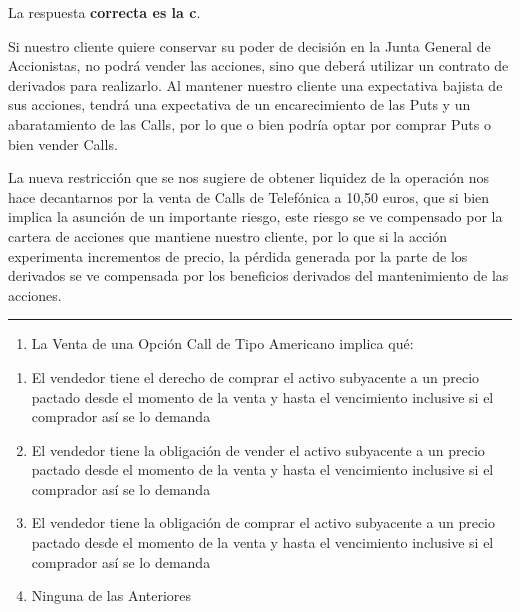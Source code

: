 \documentclass[
  letterpaper,
  DIV=11,
  numbers=noendperiod]{scrreprt}
\providecommand{\tightlist}{%
  \setlength{\itemsep}{0pt}\setlength{\parskip}{0pt}}\usepackage{longtable,booktabs,array}
\begin{document}
\begin{tcolorbox}[enhanced jigsaw, left=2mm, opacityback=0, colback=white, breakable, arc=.35mm, bottomrule=.15mm, rightrule=.15mm, toprule=.15mm, leftrule=.75mm, colframe=quarto-callout-tip-color-frame]
\begin{minipage}[t]{5.5mm}
\textcolor{quarto-callout-tip-color}{\faLightbulb}
\end{minipage}%
\begin{minipage}[t]{\textwidth - 5.5mm}

La respuesta \textbf{correcta es la c}.

Si nuestro cliente quiere conservar su poder de decisión en la Junta
General de Accionistas, no podrá vender las acciones, sino que deberá
utilizar un contrato de derivados para realizarlo. Al mantener nuestro
cliente una expectativa bajista de sus acciones, tendrá una expectativa
de un encarecimiento de las Puts y un abaratamiento de las Calls, por lo
que o bien podría optar por comprar Puts o bien vender Calls.

La nueva restricción que se nos sugiere de obtener liquidez de la
operación nos hace decantarnos por la venta de Calls de Telefónica a
10,50 euros, que si bien implica la asunción de un importante riesgo,
este riesgo se ve compensado por la cartera de acciones que mantiene
nuestro cliente, por lo que si la acción experimenta incrementos de
precio, la pérdida generada por la parte de los derivados se ve
compensada por los beneficios derivados del mantenimiento de las
acciones.

\end{minipage}%
\end{tcolorbox}

\begin{center}\rule{0.5\linewidth}{0.5pt}\end{center}

\begin{enumerate}
\def\labelenumi{\arabic{enumi}.}
\setcounter{enumi}{20}
\tightlist
\item
  La Venta de una Opción Call de Tipo Americano implica qué:
\end{enumerate}

\begin{enumerate}
\def\labelenumi{\alph{enumi})}
\item
  El vendedor tiene el derecho de comprar el activo subyacente a un
  precio pactado desde el momento de la venta y hasta el vencimiento
  inclusive si el comprador así se lo demanda
\item
  El vendedor tiene la obligación de vender el activo subyacente a un
  precio pactado desde el momento de la venta y hasta el vencimiento
  inclusive si el comprador así se lo demanda
\item
  El vendedor tiene la obligación de comprar el activo subyacente a un
  precio pactado desde el momento de la venta y hasta el vencimiento
  inclusive si el comprador así se lo demanda
\item
  Ninguna de las Anteriores
\end{enumerate}
\end{document}
